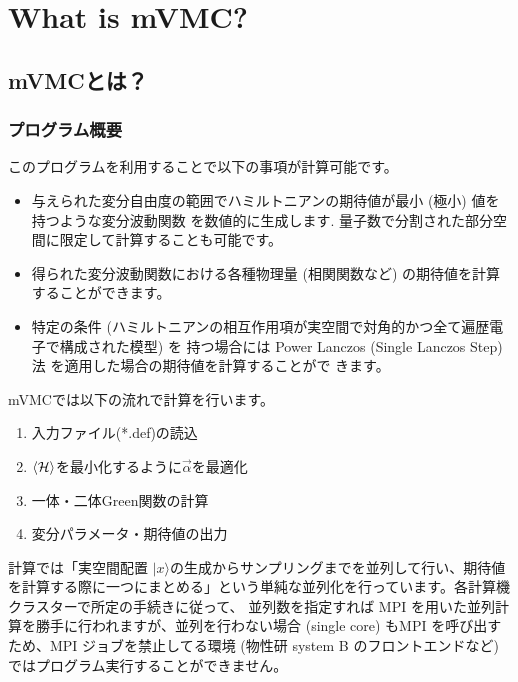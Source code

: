 \chapter{What is mVMC?}
\label{Ch:whatismVMC}
\section{mVMCとは？}
\subsection{プログラム概要}
このプログラムを利用することで以下の事項が計算可能です。
\begin{itemize}
\item{与えられた変分自由度の範囲でハミルトニアンの期待値が最小 (極小) 値を持つような変分波動関数 を数値的に生成します.   量子数で分割された部分空間に限定して計算することも可能です。}
\item{得られた変分波動関数における各種物理量 (相関関数など) の期待値を計算することができます。}
\item{
特定の条件 (ハミルトニアンの相互作用項が実空間で対角的かつ全て遍歴電子で構成された模型) を 持つ場合には Power Lanczos (Single Lanczos Step) 法 を適用した場合の期待値を計算することがで きます。}
\end{itemize}
mVMCでは以下の流れで計算を行います。
\begin{enumerate}
\item{入力ファイル(*.def)の読込}
\item{$\langle {\cal H} \rangle$を最小化するように$\vec{\alpha}$を最適化}
\item{一体・二体Green関数の計算}
\item{変分パラメータ・期待値の出力}
\end{enumerate}
計算では「実空間配置 $|x\rangle$の生成からサンプリングまでを並列して行い、期待値を計算する際に一つにまとめる」という単純な並列化を行っています。各計算機クラスターで所定の手続きに従って、 並列数を指定すれば MPI を用いた並列計算を勝手に行われますが、並列を行わない場合 (single core) もMPI を呼び出すため、MPI ジョブを禁止してる環境 (物性研 system B のフロントエンドなど) ではプログラム実行することができません。

